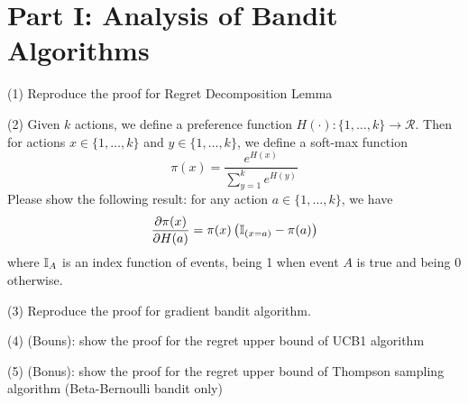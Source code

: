 \section{Part I: Analysis of Bandit Algorithms}

(1) Reproduce the proof for Regret Decomposition Lemma

(2) Given $k$ actions, we define a preference function $H(\cdot):\{1, \ldots, k\} \rightarrow \mathcal{R}$. Then for actions $x\in\{1, \ldots, k\}$ and $y\in\{1, \ldots, k\}$, we define a soft-max function
$$\pi(x)=\dfrac{e^{H(x)}}{\sum_{y=1}^k e^{H(y)}}$$
Please show the following result: for any action $a\in\{1, \ldots, k\}$, we have
$$\dfrac{\partial \pi(x)}{\partial H(a)}=\pi(x)\left(\mathbb{I}_{(x=a)}-\pi(a)\right)$$
where $\mathbb{I}_A$ is an index function of events, being 1 when event $A$ is true and being 0 otherwise.

(3) Reproduce the proof for gradient bandit algorithm.

(4) (Bouns): show the proof for the regret upper bound of UCB1 algorithm

(5) (Bonus): show the proof for the regret upper bound of Thompson sampling algorithm (Beta-Bernoulli bandit only)

\solution

